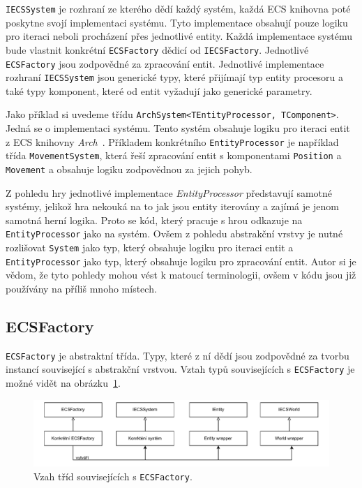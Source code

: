 \texttt{IECSSystem} je rozhraní ze kterého dědí každý systém, každá ECS knihovna poté poskytne svojí implementaci systému. Tyto implementace obsahují pouze logiku pro iteraci neboli procházení přes jednotlivé entity. Každá implementace systému bude vlastnit konkrétní \texttt{ECSFactory} dědicí od \texttt{IECSFactory}. Jednotlivé \texttt{ECSFactory} jsou zodpovědné za zpracování entit. Jednotlivé implementace rozhraní \texttt{IECSSystem} jsou generické typy, které přijímají typ entity procesoru a také typy komponent, které od entit vyžadují jako generické parametry.

Jako příklad si uvedeme třídu \texttt{ArchSystem<TEntityProcessor, TComponent>}. Jedná se o implementaci systému. Tento systém obsahuje logiku pro iteraci entit z ECS knihovny \textit{Arch}~\cite{Arch}. Příkladem konkrétního \texttt{EntityProcessor} je například třída \texttt{MovementSystem}, která řeší zpracování entit s komponentami \texttt{Position} a \texttt{Movement} a obsahuje logiku zodpovědnou za jejich pohyb.

Z pohledu hry jednotlivé implementace \textit{EntityProcessor} představují samotné systémy, jelikož hra nekouká na to jak jsou entity iterovány a zajímá je jenom samotná herní logika. Proto se kód, který pracuje s hrou odkazuje na \texttt{EntityProcessor} jako na systém. Ovšem z pohledu abstrakční vrstvy je nutné rozlišovat \texttt{System} jako typ, který obsahuje logiku pro iteraci entit a \texttt{EntityProcessor} jako typ, který obsahuje logiku pro zpracování entit. Autor si je vědom, že tyto pohledy mohou vést k matoucí terminologii, ovšem v kódu jsou již používány na příliš mnoho místech.

\subsection{ECSFactory}
\texttt{ECSFactory} je abstraktní třída. Typy, které z ní dědí jsou zodpovědné za tvorbu instancí související s abstrakční vrstvou. Vztah typů souvisejících s \texttt{ECSFactory} je možné vidět na obrázku~\ref{fig:abstract-layer-ecsfactory}.

\begin{figure}[!htb]
  \centering
  \includegraphics[width=1.0\linewidth]{img/abstract-layer-ecsfactory.pdf}
  \caption{Vzah tříd souvisejících s \texttt{ECSFactory}.}
  \label{fig:abstract-layer-ecsfactory}
\end{figure}


